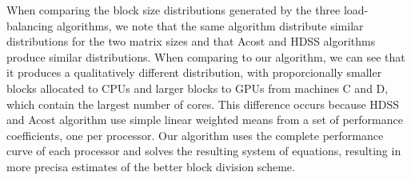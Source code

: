 \documentclass[journal]{IEEEtran}
\begin{document}
When comparing the block size distributions generated by the three
load-balancing algorithms, we note that the same algorithm distribute similar
distributions for the two matrix sizes and that Acost and HDSS algorithms
produce similar distributions. When comparing to our algorithm, we can see that
it produces a qualitatively different distribution, with proporcionally smaller
blocks allocated to CPUs and larger blocks to GPUs from machines C and D, which
contain the largest number of cores. This difference occurs because HDSS and
Acost algorithm use simple linear weighted means from a set of performance
coefficients, one per processor. Our algorithm uses the complete performance
curve of each processor and solves the resulting system of equations, resulting
in more precisa estimates of the better block division scheme.


\end{document}
